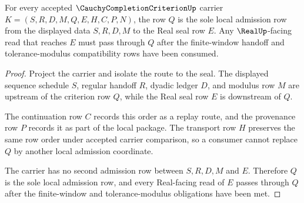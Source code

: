 \begin{theorem}
\label{thm:cauchy-completion-criterion-criterion-admission}
For every accepted $\CauchyCompletionCriterionUp$ carrier $K=(S,R,D,M,Q,E,H,C,P,N)$, the row $Q$ is the sole local admission row from the displayed data $S,R,D,M$ to the Real seal row $E$. Any $\RealUp$-facing read that reaches $E$ must pass through $Q$ after the finite-window handoff and tolerance-modulus compatibility rows have been consumed.
\end{theorem}
\begin{proof}
Project the carrier and isolate the route to the seal. The displayed sequence schedule $S$, regular handoff $R$, dyadic ledger $D$, and modulus row $M$ are upstream of the criterion row $Q$, while the Real seal row $E$ is downstream of $Q$.

The continuation row $C$ records this order as a replay route, and the provenance row $P$ records it as part of the local package. The transport row $H$ preserves the same row order under accepted carrier comparison, so a consumer cannot replace $Q$ by another local admission coordinate.

The carrier has no second admission row between $S,R,D,M$ and $E$. Therefore $Q$ is the sole local admission row, and every Real-facing read of $E$ passes through $Q$ after the finite-window and tolerance-modulus obligations have been met.
\end{proof}

